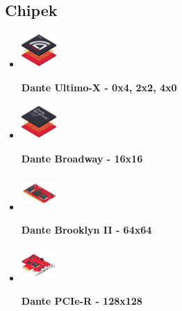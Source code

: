 \subsection{Chipek}
\begin{itemize}
    \item 
    \begin{minipage}[t]{.2\textwidth}
        \includegraphics[width=50px,height=50px,keepaspectratio]{figures/ultimo-x.jpg}
    \end{minipage}%
    \begin{minipage}[t]{.8\textwidth}
        \textbf{Dante Ultimo-X - 0x4, 2x2, 4x0}
    \end{minipage}

    \item 
    \begin{minipage}[t]{.2\textwidth}
        \includegraphics[width=50px,height=50px,keepaspectratio]{figures/broadway.jpg}
    \end{minipage}%
    \begin{minipage}[t]{.8\textwidth}
        \textbf{Dante Broadway - 16x16}
    \end{minipage}

    \item 
    \begin{minipage}[t]{.2\textwidth}
        \includegraphics[width=50px,height=50px,keepaspectratio]{figures/brooklyn-ii.jpg}
    \end{minipage}%
    \begin{minipage}[t]{.8\textwidth}
        \textbf{Dante Brooklyn II - 64x64}
    \end{minipage}

    \item 
    \begin{minipage}[t]{.2\textwidth}
        \includegraphics[width=50px,height=50px,keepaspectratio]{figures/pcie-r.jpg}
    \end{minipage}%
    \begin{minipage}[t]{.8\textwidth}
        \textbf{Dante PCIe-R - 128x128}
    \end{minipage}


\end{itemize}
